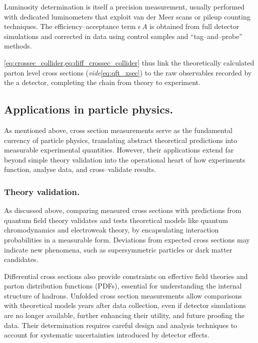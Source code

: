 \begin{definition}
        Luminosity determination is itself a precision measurement, usually performed with dedicated luminometers that exploit van der Meer scans or pileup counting techniques.
        The efficiency--acceptance term \(\epsilon\,A\) is obtained from full detector simulations and corrected in data using control samples and ``tag--and--probe'' methods.

        \cref{eq:crossec_collider,eq:diff_crossec_collider} thus link the theoretically calculated parton level cross sections (\textit{vide}\cref{eq:qft_xsec}) to the raw observables recorded by the a detector, completing the chain from theory to experiment.

    \subsection{Applications in particle physics.}
        As mentioned above, cross section measurements serve as the fundamental currency of particle physics, translating abstract theoretical predictions into measurable experimental quantities.
        However, their applications extend far beyond simple theory validation into the operational heart of how experiments function, analyse data, and cross--validate results.
        \subsubsection{Theory validation.}
            As discussed above, comparing measured cross sections with predictions from quantum field theory validates and tests theoretical models like quantum chromodynamics and electroweak theory, by encapsulating interaction probabilities in a measurable form.
            Deviations from expected cross sections may indicate new phenomena, such as supersymmetric particles or dark matter candidates.
            
            Differential cross sections also provide constraints on effective field theories and parton distribution functions (PDFs), essential for understanding the internal structure of hadrons.
            Unfolded cross section measurements allow comparisons with theoretical models years after data collection, even if detector simulations are no longer available, further enhancing their utility, and future proofing the data.
            Their determination requires careful design and analysis techniques to account for systematic uncertainties introduced by detector effects.


\end{definition}
